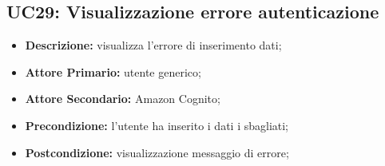 \subsection{UC29: Visualizzazione errore autenticazione }
\label{sec:UC29}
\begin{itemize}
    \item \textbf{Descrizione:} visualizza l'errore di inserimento dati;
    \item \textbf{Attore Primario:} utente generico;
    \item \textbf{Attore Secondario:} Amazon Cognito;
    \item \textbf{Precondizione:} l'utente ha inserito i dati i sbagliati;
    \item \textbf{Postcondizione:} visualizzazione messaggio di errore;
\end{itemize}